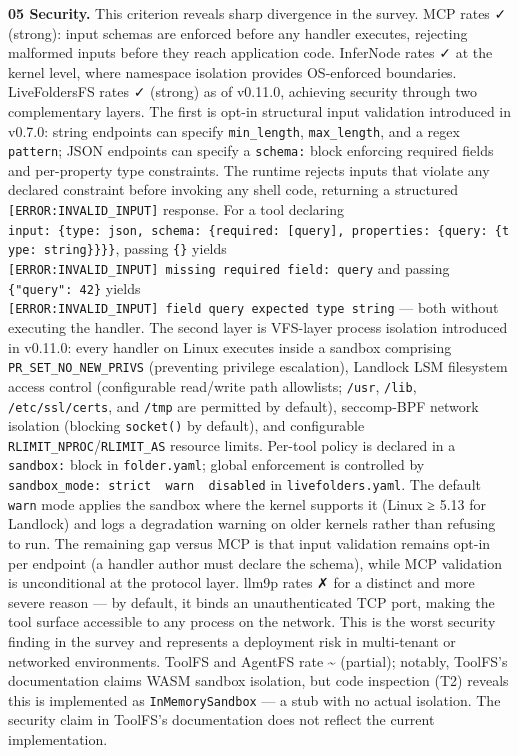 \documentclass[
  11pt,
]{article}
\begin{document}
\textbf{05 Security.} This criterion reveals sharp divergence in the
survey. MCP rates ✓ (strong): input schemas are enforced before any
handler executes, rejecting malformed inputs before they reach
application code. InferNode rates ✓ at the kernel level, where namespace
isolation provides OS-enforced boundaries. LiveFoldersFS rates ✓
(strong) as of v0.11.0, achieving security through two complementary
layers. The first is opt-in structural input validation introduced in
v0.7.0: string endpoints can specify \texttt{min\_length},
\texttt{max\_length}, and a regex \texttt{pattern}; JSON endpoints can
specify a \texttt{schema:} block enforcing required fields and
per-property type constraints. The runtime rejects inputs that violate
any declared constraint before invoking any shell code, returning a
structured \texttt{{[}ERROR:INVALID\_INPUT{]}} response. For a tool
declaring
\texttt{input:\ \{type:\ json,\ schema:\ \{required:\ {[}query{]},\ properties:\ \{query:\ \{type:\ string\}\}\}\}},
passing \texttt{\{\}} yields
\texttt{{[}ERROR:INVALID\_INPUT{]}\ missing\ required\ field:\ \textquotesingle{}query\textquotesingle{}}
and passing \texttt{\{"query":\ 42\}} yields
\texttt{{[}ERROR:INVALID\_INPUT{]}\ field\ \textquotesingle{}query\textquotesingle{}\ expected\ type\ \textquotesingle{}string\textquotesingle{}}
--- both without executing the handler. The second layer is VFS-layer
process isolation introduced in v0.11.0: every handler on Linux executes
inside a sandbox comprising \texttt{PR\_SET\_NO\_NEW\_PRIVS} (preventing
privilege escalation), Landlock LSM filesystem access control
(configurable read/write path allowlists; \texttt{/usr}, \texttt{/lib},
\texttt{/etc/ssl/certs}, and \texttt{/tmp} are permitted by default),
seccomp-BPF network isolation (blocking \texttt{socket()} by default),
and configurable \texttt{RLIMIT\_NPROC}/\texttt{RLIMIT\_AS} resource
limits. Per-tool policy is declared in a \texttt{sandbox:} block in
\texttt{folder.yaml}; global enforcement is controlled by
\texttt{sandbox\_mode:\ strict\ \textbar{}\ warn\ \textbar{}\ disabled}
in \texttt{livefolders.yaml}. The default \texttt{warn} mode applies the
sandbox where the kernel supports it (Linux ≥ 5.13 for Landlock) and
logs a degradation warning on older kernels rather than refusing to run.
The remaining gap versus MCP is that input validation remains opt-in per
endpoint (a handler author must declare the schema), while MCP
validation is unconditional at the protocol layer. llm9p rates ✗ for a
distinct and more severe reason --- by default, it binds an
unauthenticated TCP port, making the tool surface accessible to any
process on the network. This is the worst security finding in the survey
and represents a deployment risk in multi-tenant or networked
environments. ToolFS and AgentFS rate \textasciitilde{} (partial);
notably, ToolFS's documentation claims WASM sandbox isolation, but code
inspection (T2) reveals this is implemented as \texttt{InMemorySandbox}
--- a stub with no actual isolation. The security claim in ToolFS's
documentation does not reflect the current implementation.
\end{document}
